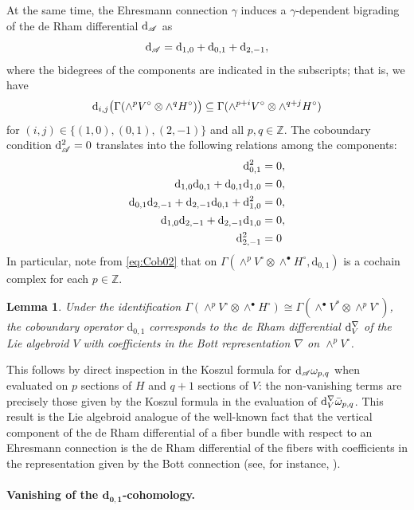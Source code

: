 \documentclass[12pt,letterpaper]{article}
\newcommand{\Z}{\mathbb{Z}}
\newcommand{\A}{\mathscr{A}}
\let\oldd\d
\renewcommand{\d}{%
  \relax\ifmmode\mathrm{d}\else\oldd\fi
}
\renewcommand{\dh}{%
  \relax\ifmmode\mathrm{d}_{1,0}\else\olddh\fi
}
\newcommand{\dv}{\mathrm{d}_{0,1}}
\newcommand{\dR}{\mathrm{d}_{2,-1}}
\newtheorem{lemma}[theorem]{Lemma}
\numberwithin{equation}{section}
\begin{document}
At the same time, the Ehresmann connection $\gamma$ induces a $\gamma$-dependent bigrading of the de Rham differential $\d_\A$ as
\[
  \d_\A = \dh + \dv + \dR,
\]
where the bidegrees of the components are indicated in the subscripts; that is, we have
\begin{align*}
    \d_{i,j}\big(\Gamma(\wedge^p V^\circ \otimes \wedge^q H^\circ)\big) \subseteq \Gamma(\wedge^{p+i} V^\circ \otimes \wedge^{q+j} H^\circ)
\end{align*}
for $(i,j)\in\{(1,0),(0,1),(2,-1)\}$ and all $p,q\in\Z$.
The coboundary condition $\d_\A^2=0$ translates into the following relations among the components:
\begin{align}
    \dv^2 &= 0, \label{eq:Cob02} \\
    \dh\dv + \dv\dh &= 0, \label{eq:Cob11} \\
    \dv\dR + \dR\dv + \dh^2 &= 0, \label{eq:Cob20} \\
    \dh\dR + \dR\dh &= 0, \label{eq:Cob3-1} \\
    \dR^2 &= 0 \label{eq:Cob4-2}
\end{align}
In particular, note from \eqref{eq:Cob02} that on $\Gamma(\wedge^{p}V^\circ \otimes \wedge^{\bullet}H^\circ , \dv)$
is a cochain complex for each $p\in\Z$.

\begin{lemma}\label{lemma:iso_dv}
Under the identification $\Gamma(\wedge^p V^\circ \otimes \wedge^\bullet H^\circ)\cong\Gamma(\wedge^\bullet V^*\otimes\wedge^p V^\circ)$, 
the coboundary operator $\dv$ corresponds to the de Rham differential $\d_V^\nabla$ of the Lie algebroid $V$ 
with coefficients in the Bott representation $\nabla$ on $\wedge^{p}V^\circ$.
\end{lemma}

This follows by direct inspection in the Koszul formula for $\d_\A\omega_{p,q}$
when evaluated on $p$ sections of $H$ and $q+1$ sections of $V$:
the non-vanishing terms are precisely those given by the Koszul formula in the evaluation of $\d_V^\nabla\bar{\omega}_{p,q}$.
This result is the Lie algebroid analogue of the well-known fact that 
the vertical component of the de Rham differential of a fiber bundle with respect to an Ehresmann connection 
is the de Rham differential of the fibers with coefficients in the representation given by the Bott connection
(see, for instance, \cite[Section 2]{Brahic2011}).

\paragraph{Vanishing of the $\bm{d_{0,1}}$-cohomology.}
\end{document}
